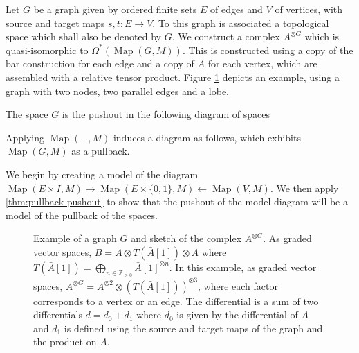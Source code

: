 \documentclass{scrartcl}
\theoremstyle{plain}
\theoremstyle{definition}
\newcommand{\Z}{\mathbb Z}
\newcommand{\from}{\leftarrow}
\DeclareMathOperator{\Map}{Map}
\DeclareMathOperator{\BC}{B}
\renewcommand{\coprod}{\mathbin{\amalg}}
\newcommand{\blank}{-}
\begin{document}
Let $G$ be a graph given by ordered finite sets $E$ of edges and $V$ of vertices, with source and target maps $s, t\colon E\to V$. To this graph is associated a topological space which shall also be denoted by $G$. We construct a complex $A^{\otimes G}$ which is quasi-isomorphic to $\Omega^*(\Map(G, M))$. This is constructed using a copy of the bar construction for each edge and a copy of $A$ for each vertex, which are assembled with a relative tensor product. Figure \ref{fig:graph-model-example} depicts an example, using a graph with two nodes, two parallel edges and a lobe. 

The space $G$ is the pushout in the following diagram of spaces
\begin{center}
\end{center}
Applying $\Map(\blank, M)$ induces a diagram as follows, which exhibits $\Map(G, M)$ as a pullback. 
\begin{center}\label{diag:mapping-space-pullback}
\end{center}
We begin by creating a model of the diagram $\Map(E\times I, M) \to \Map(E\times \{0, 1\}, M)  \from \Map(V, M)$. We then apply \cref{thm:pullback-pushout} to show that the pushout of the model diagram will be a model of the pullback of the spaces. 


\begin{figure}[h]
    \center
    \caption{Example of a graph $G$ and sketch of the complex $A^{\otimes G}$. As graded vector spaces, $B = A\otimes T(\bar A[1])\otimes A$ where $T(\bar A[1]) = \bigoplus_{n\in \Z_{\geq 0}} \bar A[1]^{\otimes n}$. In this example, as graded vector spaces, $A^{\otimes G} = A^{\otimes 2} \otimes (T(\bar A[1]))^{\otimes 3}$, where each factor corresponds to a vertex or an edge. The differential is a sum of two differentials $d=d_0+d_1$ where $d_0$ is given by the differential of $A$ and $d_1$ is defined using the source and target maps of the graph and the product on $A$. }\label{fig:graph-model-example}
\end{figure}
\end{document}
